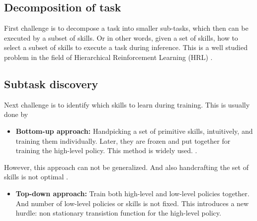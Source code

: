 \subsection{Decomposition of task}
First challenge is to decompose a task into smaller sub-tasks, which then can be executed by a subset of skills. Or in other words, given a set of skills, how to select a subset of skills to execute a task during inference. This is a well studied problem in the field of Hierarchical Reinforcement Learning (HRL) \cite{hutsebaut-buysseHierarchicalReinforcementLearning2022} .

\subsection{Subtask discovery}
Next challenge is to identify which skills to learn during training. This is usually done by

\begin{itemize}
\item \textbf{Bottom-up approach:} 
Handpicking a set of primitive skills, intuitively, and training them individually. Later, they are frozen and put together for training the high-level policy. This method is widely used. \cite{pateriaHierarchicalReinforcementLearning2021}.
\end{itemize}

However, this approach can not be generalized. And also handcrafting the set of skills is not optimal \cite{silverWelcomeEraExperience}.

\begin{itemize}
\item \textbf{Top-down approach:}
Train both high-level and low-level policies together. And number of low-level policies or skills is not fixed. This introduces a new hurdle: non stationary transistion function for the high-level policy.

\end{itemize}

